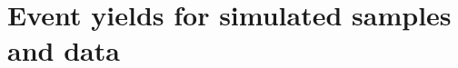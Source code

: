 \section{Event yields for simulated samples and data}
\label{app:cutflow}


\renewcommand{\arraystretch}{1.45}
\begin{table}[!h]
\centering
\caption{Event yields after each selection step for various background processes.}
\label{tab:CutflowMC}
\end{table}
